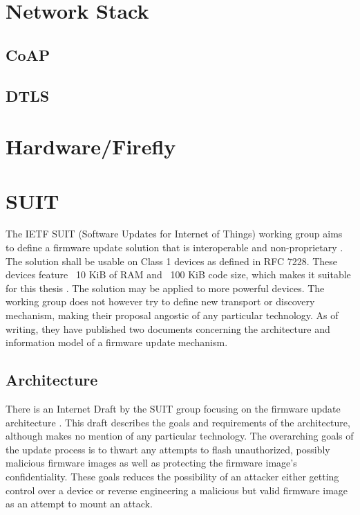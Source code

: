 \documentclass[0-thesis.tex]{subfiles}
\begin{document}
\section{Network Stack}
\subsection{CoAP}

\subsection{DTLS}

\section{Hardware/Firefly}

\section{SUIT}
The IETF SUIT (Software Updates for Internet of Things) working group aims to define a firmware 
update solution that is interoperable and non-proprietary \parencite{suit}. The solution shall 
be usable on Class 1 devices as defined in RFC 7228. These devices feature ~10 KiB of RAM and 
~100 KiB code size, which makes it suitable for this thesis \parencite{rfc7228}. The solution 
may be applied to more powerful devices. The working group does not however try to define 
new transport or discovery mechanism, making their proposal angostic of any particular 
technology. As of writing, they have published two documents concerning the architecture and 
information model of a firmware update mechanism.

\subsection{Architecture}
There is an Internet Draft by the SUIT group focusing on the firmware update architecture 
\parencite{suit-architecture}. This draft describes the goals and requirements of the 
architecture, although makes no mention of any particular technology. The overarching goals 
of the update process is to thwart any attempts to flash unauthorized, possibly malicious 
firmware images as well as protecting the firmware image's confidentiality. These goals 
reduces the possibility of an attacker either getting control over a device or 
reverse engineering a malicious but valid firmware image as an attempt to mount an attack.
\end{document}
